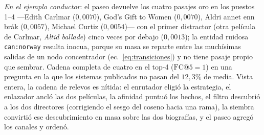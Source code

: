 \documentclass[11pt,a4paper]{article}
\begin{document}
\emph{En el ejemplo conductor}: el paseo devuelve los cuatro pasajes oro
en los puestos 1--4 ---Edith Carlmar ($0{,}0070$), God's Gift to Women
($0{,}0070$), Aldri annet enn bråk ($0{,}0057$), Michael Curtiz
($0{,}0054$)--- con el primer distractor (otra película de Carlmar,
\emph{Altid ballade}) cinco veces por debajo ($0{,}0013$); la entidad
ruidosa \texttt{can:norway} resulta inocua, porque su masa se reparte
entre las muchísimas salidas de un nodo concentrador
(ec.~\ref{eq:transiciones}) y no tiene pasaje propio que sembrar. Cadena
completa de cuatro en el top-4 ($\mathrm{FC@}5=1$) en una pregunta en la
que los sistemas publicados no pasan del $12{,}3\%$ de media. Vista
entera, la cadena de relevos es nítida: el enrutador eligió la estrategia,
el enlazador ancló las dos películas, la afinidad puntuó los hechos, el
filtro descubrió a los dos directores (corrigiendo el sesgo del coseno
hacia una rama), la siembra convirtió ese descubrimiento en masa sobre las
dos biografías, y el paseo agregó los canales y ordenó.
\end{document}
